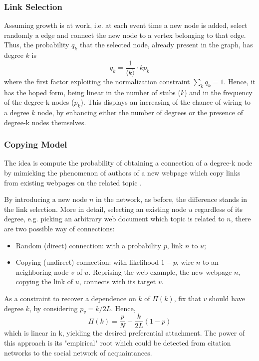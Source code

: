 \documentclass[a4paper,12pt,twoside]{book} %
\theoremstyle{definition}
\begin{document}
\subsubsection{Link Selection}
Assuming growth is at work, i.e. at each event time a new node is added, select randomly a edge and connect the new node to a vertex belonging to that edge.
Thus, the probability $q_k$ that the selected node, already present in the graph, has degree $k$ is 
\begin{equation}
	q_k = \frac{1}{\langle k \rangle} \cdot k p_k
\end{equation}
where the first factor exploiting the normalization constraint $\sum_k q_k = 1$.
Hence, it has the hoped form, being linear in the number of stubs ($k$) and in the frequency of the degree-k nodes ($p_k$). This displays an increasing of the chance of wiring to a degree $k$ node, by enhancing either the number of degrees or the presence of degree-k nodes themselves.

\subsubsection{Copying Model}
The idea is compute the probability of obtaining a connection of a degree-k node by mimicking the phenomenon of authors of a new webpage which copy links from existing webpages on the related topic \cite{Kleinberg:1999_WebAsAGraph}.

By introducing a new node $n$ in the network, as before, the difference stands in the link selection.
More in detail, selecting an existing node $u$ regardless of its degree, e.g. picking an arbitrary web document which topic is related to $n$, there are two possible way of connections:
\begin{itemize}
	\item Random (direct) connection: with a probability $p$, link $n$ to $u$;
	\item Copying (undirect) connection: with likelihood $1-p$, wire $n$ to an neighboring node $v$ of $u$. Reprising the web example, the new webpage $n$, copying the link of $u$, connects with its target $v$.
\end{itemize}

As a constraint to recover a dependence on $k$ of $\Pi(k)$, fix that $v$ should have degree $k$, by considering $p_v = k/2L$.
Hence, 
\begin{equation}
	\Pi(k) = \frac{p}{N} + \frac{k}{2L}(1-p)
	\label{eq:Pik_recovering}
\end{equation}
which is linear in k, yielding the desired preferential attachment.
The power of this approach is its "empirical" root which could be detected from citation networks to the social network of acquaintances.
\end{document}
